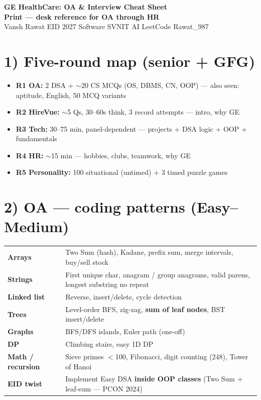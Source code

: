 \documentclass[a4paper,9pt]{extarticle}
\begin{document}
\begin{center}
  {\LARGE\textbf{GE HealthCare: OA \& Interview Cheat Sheet}}\\[0.5pt]
  {\small\color{hot}\textbf{Print --- desk reference for OA through HR}}\\[1pt]
  {\small Vansh Rawat \textbar{} EID 2027 Software \textbar{} SVNIT AI \textbar{} LeetCode Rawat\_987}
\end{center}

\section{1) Five-round map (senior + GFG)}
\begin{itemize}
  \item \textbf{R1 OA:} 2 DSA + $\sim$20 CS MCQs (OS, DBMS, CN, OOP) --- also seen: aptitude, English, 50 MCQ variants
  \item \textbf{R2 HireVue:} $\sim$5 Qs, 30--60s think, 3 record attempts --- intro, why GE
  \item \textbf{R3 Tech:} 30--75 min, panel-dependent --- projects + DSA logic + OOP + fundamentals
  \item \textbf{R4 HR:} $\sim$15 min --- hobbies, clubs, teamwork, why GE
  \item \textbf{R5 Personality:} 100 situational (untimed) + 3 timed puzzle games
\end{itemize}

\section{2) OA --- coding patterns (Easy--Medium)}
\noindent\begin{tabularx}{\textwidth}{@{}>{\bfseries}p{2.8cm} X@{}}
Arrays & Two Sum (hash), Kadane, prefix sum, merge intervals, buy/sell stock \\
Strings & First unique char, anagram / group anagrams, valid parens, longest substring no repeat \\
Linked list & Reverse, insert/delete, cycle detection \\
Trees & Level-order BFS, zig-zag, \textbf{sum of leaf nodes}, BST insert/delete \\
Graphs & BFS/DFS islands, Euler path (one-off) \\
DP & Climbing stairs, easy 1D DP \\
Math / recursion & Sieve primes $<$100, Fibonacci, digit counting (248), Tower of Hanoi \\
\textbf{EID twist} & Implement Easy DSA \textbf{inside OOP classes} (Two Sum + leaf-sum --- PCON 2024) \\
\end{tabularx}
\end{document}
